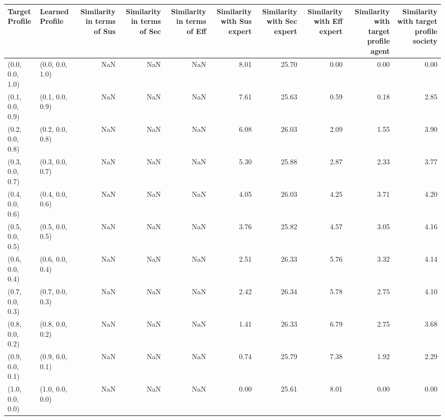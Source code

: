 \begin{tabular}{llrrrrrrrr}
\toprule
Target Profile & Learned Profile & Similarity in terms of Sus & Similarity in terms of Sec & Similarity in terms of Eff & Similarity with Sus expert & Similarity with Sec expert & Similarity with Eff expert & Similarity with target profile agent & Similarity with target profile society \\
\midrule
(0.0, 0.0, 1.0) & (0.0, 0.0, 1.0) & NaN & NaN & NaN & 8.01 & 25.70 & 0.00 & 0.00 & 0.00 \\
(0.1, 0.0, 0.9) & (0.1, 0.0, 0.9) & NaN & NaN & NaN & 7.61 & 25.63 & 0.59 & 0.18 & 2.85 \\
(0.2, 0.0, 0.8) & (0.2, 0.0, 0.8) & NaN & NaN & NaN & 6.08 & 26.03 & 2.09 & 1.55 & 3.90 \\
(0.3, 0.0, 0.7) & (0.3, 0.0, 0.7) & NaN & NaN & NaN & 5.30 & 25.88 & 2.87 & 2.33 & 3.77 \\
(0.4, 0.0, 0.6) & (0.4, 0.0, 0.6) & NaN & NaN & NaN & 4.05 & 26.03 & 4.25 & 3.71 & 4.20 \\
(0.5, 0.0, 0.5) & (0.5, 0.0, 0.5) & NaN & NaN & NaN & 3.76 & 25.82 & 4.57 & 3.05 & 4.16 \\
(0.6, 0.0, 0.4) & (0.6, 0.0, 0.4) & NaN & NaN & NaN & 2.51 & 26.33 & 5.76 & 3.32 & 4.14 \\
(0.7, 0.0, 0.3) & (0.7, 0.0, 0.3) & NaN & NaN & NaN & 2.42 & 26.34 & 5.78 & 2.75 & 4.10 \\
(0.8, 0.0, 0.2) & (0.8, 0.0, 0.2) & NaN & NaN & NaN & 1.41 & 26.33 & 6.79 & 2.75 & 3.68 \\
(0.9, 0.0, 0.1) & (0.9, 0.0, 0.1) & NaN & NaN & NaN & 0.74 & 25.79 & 7.38 & 1.92 & 2.29 \\
(1.0, 0.0, 0.0) & (1.0, 0.0, 0.0) & NaN & NaN & NaN & 0.00 & 25.61 & 8.01 & 0.00 & 0.00 \\
\bottomrule
\end{tabular}
